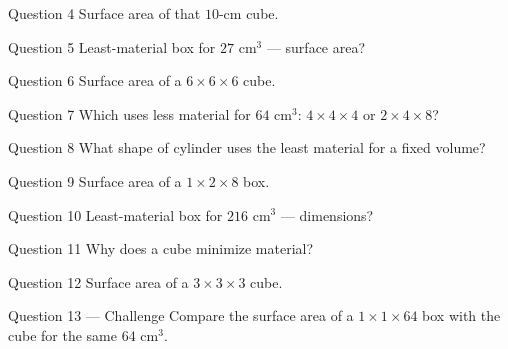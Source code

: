 \documentclass[11pt]{article}
\begin{document}
\begin{qbox}{Question 4}
Surface area of that $10$-cm cube.\workspace{2.4cm}
\end{qbox}

\begin{qbox}{Question 5}
Least-material box for $27$ cm$^3$ — surface area?\workspace{2.4cm}
\end{qbox}

\begin{qbox}{Question 6}
Surface area of a $6\times6\times6$ cube.\workspace{2.4cm}
\end{qbox}

\begin{qbox}{Question 7}
Which uses less material for $64$ cm$^3$: $4\times4\times4$ or $2\times4\times8$?\workspace{2.4cm}
\end{qbox}

\begin{qbox}{Question 8}
What shape of cylinder uses the least material for a fixed volume?\workspace{2.4cm}
\end{qbox}

\begin{qbox}{Question 9}
Surface area of a $1\times2\times8$ box.\workspace{2.4cm}
\end{qbox}

\begin{qbox}{Question 10}
Least-material box for $216$ cm$^3$ — dimensions?\workspace{2.4cm}
\end{qbox}

\begin{qbox}{Question 11}
Why does a cube minimize material?\workspace{2.4cm}
\end{qbox}

\begin{qbox}{Question 12}
Surface area of a $3\times3\times3$ cube.\workspace{2.4cm}
\end{qbox}

\begin{qbox}{Question 13 --- Challenge}
Compare the surface area of a $1\times1\times64$ box with the cube for the same $64$ cm$^3$.\workspace{3cm}
\end{qbox}

\clearpage
{}
\end{document}
